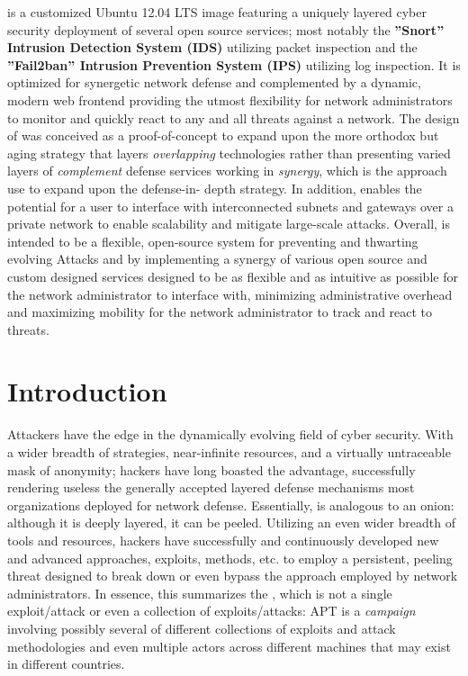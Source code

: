 \documentclass[11.5pt,letterpaper,titlepage]{report}
\begin{document}
\scarletshield is a customized Ubuntu 12.04 LTS image featuring a uniquely
layered cyber security deployment of several open source services; most notably
the \textbf{''Snort'' Intrusion Detection System (IDS)} utilizing packet inspection and the
\textbf{''Fail2ban'' Intrusion Prevention System (IPS)} utilizing log inspection.  It is
optimized for synergetic network defense and complemented by a dynamic, modern
web frontend providing the utmost flexibility for network administrators to
monitor and quickly react to any and all threats against a network.  The design
of  was conceived as a proof-of-concept to expand upon the more
orthodox but aging \did strategy that layers \emph{overlapping}
technologies rather than presenting varied layers of \emph{complement} defense services
working in \emph{synergy}, which is the approach use to expand upon the defense-in-
depth strategy.  In addition, \scarletshield enables the potential for a user to
interface with interconnected subnets and gateways over a private network to
enable scalability and mitigate large-scale attacks.  Overall, \scarletshield is
intended to be a flexible, open-source system for preventing and thwarting
evolving \ddos Attacks and \apt
by implementing a synergy of various open source and custom
designed services designed to be as flexible and as intuitive as possible for
the network administrator to interface with, minimizing administrative overhead
and maximizing mobility for the network administrator to track and react to
threats.

\section{Introduction}

Attackers have the edge in the dynamically evolving field of cyber security.
With a wider breadth of strategies, near-infinite resources, and a virtually
untraceable mask of anonymity; hackers have long boasted the advantage,
successfully rendering useless the generally accepted \did layered
defense mechanisms most organizations deployed for network defense.
Essentially, is analogous to an onion: although it is deeply
layered, it can be peeled.  Utilizing an even wider breadth of tools and
resources, hackers have successfully and continuously developed new and advanced
approaches, exploits, \dos methods, etc. to employ a
persistent, peeling threat designed to break down or even bypass the \did 
approach employed by network administrators.  In essence, this summarizes
the \apt, which is not a single exploit/attack or even a
collection of exploits/attacks: APT is a \emph{campaign} involving possibly several of
different collections of exploits and attack methodologies and even multiple
actors across different machines that may exist in different countries.
\end{document}

